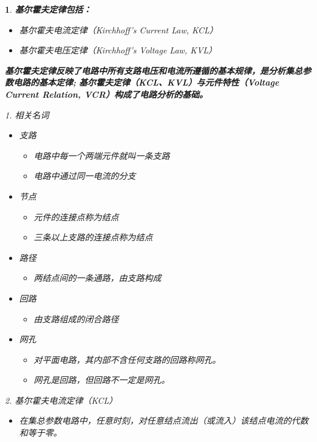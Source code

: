 \documentclass[UTF8]{report}
\theoremstyle{MyLineTheoremStyle} %
\theoremstyle{MyBlockTheoremStyle} %
\theoremstyle{MySubsubsectionStyle} %
\newtheorem{definition}{}
\begin{document}
\begin{definition}
    \textbf{基尔霍夫定律包括：}
    \begin{itemize}
        \item 基尔霍夫电流定律（Kirchhoff’s Current Law, KCL）
        \item 基尔霍夫电压定律（Kirchhoff’s Voltage Law, KVL）
    \end{itemize}
    \textbf{基尔霍夫定律反映了电路中所有支路电压和电流所遵循的基本规律，是分析集总参数电路的基本定律;}
    \textbf{基尔霍夫定律（KCL、KVL）与元件特性（Voltage Current Relation, VCR）构成了电路分析的基础。}

    1. 相关名词
    \begin{itemize}
        \item 支路
        \begin{itemize}
            \item 电路中每一个两端元件就叫一条支路
            \item 电路中通过同一电流的分支
        \end{itemize}
        \item 节点
        \begin{itemize}
            \item 元件的连接点称为结点
            \item 三条以上支路的连接点称为结点
        \end{itemize}
        \item 路径
        \begin{itemize}
            \item 两结点间的一条通路，由支路构成
        \end{itemize}
        \item 回路
        \begin{itemize}
            \item 由支路组成的闭合路径
        \end{itemize}
        \item 网孔
        \begin{itemize}
            \item 对平面电路，其内部不含任何支路的回路称网孔。
            \item 网孔是回路，但回路不一定是网孔。
        \end{itemize}
    \end{itemize}

    2. 基尔霍夫电流定律（KCL）
    \begin{itemize}
        \item 在集总参数电路中，任意时刻，对任意结点流出（或流入）该结点电流的代数和等于零。
    \end{itemize}


\end{definition}
\end{document}
